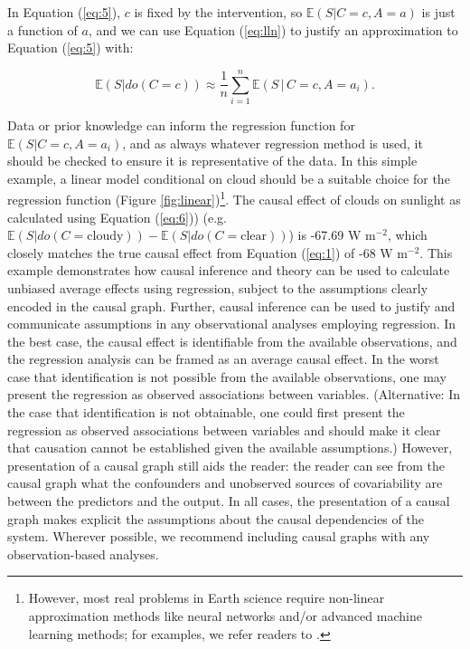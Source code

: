 \documentclass[12pt]{article}
\begin{document}
In Equation (\ref{eq:5}), $c$ is fixed by the intervention, so
$\mathbb{E}(S| C=c, A=a)$ is just a function of $a$, and we can use
Equation (\ref{eq:lln}) to justify an approximation to Equation
(\ref{eq:5}) with:

\begin{equation} \mathbb{E}(S | do(C = c)) \approx \frac{1}{n}
  \sum_{i=1}^n \mathbb{E}(S \, | \, C=c, A=a_i).
  \label{eq:6}
\end{equation}

Data or prior knowledge can inform the regression function for
$\mathbb{E}(S | C=c, A=a_i)$, and as always whatever regression method
is used, it should be checked to ensure it is representative of the
data. In this simple example, a linear model conditional on cloud
should be a suitable choice for the regression function (Figure
\ref{fig:linear})\footnote{However, most real problems in Earth
  science require non-linear approximation methods like neural
  networks and/or advanced machine learning methods; for examples, we
  refer readers to \citep{bishop2006pattern}.}. The causal effect of
clouds on sunlight as calculated using Equation (\ref{eq:6})) (e.g.
$\mathbb{E}(S | do(C = \text{cloudy})) - \mathbb{E}(S | do(C =
\text{clear}))$) is -67.69 W m$^{-2}$, which closely matches the true
causal effect from Equation (\ref{eq:1}) of -68 W m$^{-2}$. This
example demonstrates how causal inference and theory can be used to
calculate unbiased average effects using regression, subject to the
assumptions clearly encoded in the causal graph. Further, causal
inference can be used to justify and communicate assumptions in any
observational analyses employing regression. In the best case, the
causal effect is identifiable from the available observations, and the
regression analysis can be framed as an average causal effect. In the worst case that identification is not possible
from the available observations, one may present the regression as
observed associations between variables. (Alternative: In the
case that identification is not obtainable, one could first present
the regression as observed associations between variables and should
make it clear that causation cannot be established given the available
assumptions.) However, presentation of a
causal graph still aids the reader: the reader can see from the causal
graph what the confounders and unobserved sources of covariability are
between the predictors and the output. In all cases, the presentation
of a causal graph makes explicit the assumptions about the causal
dependencies of the system. Wherever possible, we recommend including
causal graphs with any observation-based analyses.
\end{document}
